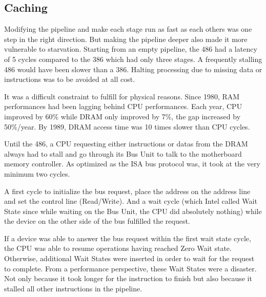 \subsection{Caching }
Modifying the pipeline and make each stage run as fast as each others was one step in the right direction. But making the pipeline deeper also made it more vulnerable to starvation. Starting from an empty pipeline, the 486 had a latency of 5 cycles compared to the 386 which had only three stages. A frequently stalling 486 would have been slower than a 386. Halting processing due to missing data or instructions was to be avoided at all cost.\\
\par
It was a difficult constraint to fulfill for physical reasons. Since 1980, RAM performances had been lagging behind CPU performances. Each year, CPU improved by 60\% while DRAM only improved by 7\%, the gap increased by 50\%/year. By 1989, DRAM access time was 10 times slower than CPU cycles.\\
\par
\vspace{2mm}
\par
Until the 486, a CPU requesting either instructions or datas from the DRAM always had to stall and go through its Bus Unit to talk to the motherboard memory controller. As optimized as the ISA bus protocol was, it took at the very minimum two cycles.\\
\par 
A first cycle to initialize the bus request, place the address on the address line and set the control line (Read/Write). And a wait cycle (which Intel called Wait State since while waiting on the Bus Unit, the CPU did absolutely nothing) while the device on the other side of the bus fulfilled the request.\\
\par
{}
\par
If a device was able to answer the bus request within the first wait state cycle, the CPU was able to resume operations having reached Zero Wait state. Otherwise, additional Wait States were inserted in order to wait for the request to complete. From a performance perspective, these Wait States were a disaster. Not only because it took longer for the instruction to finish but also because it stalled all other instructions in the pipeline.\\
\par
{}
